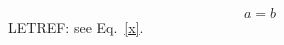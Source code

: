 \documentclass{article}
\let\oldeqref\eqref
\renewcommand{\eqref}[1]{Eq.~\oldeqref{#1}}
\begin{document}
\begin{equation} a=b \label{x} \end{equation}
LETREF: see \eqref{x}.
\end{document}
